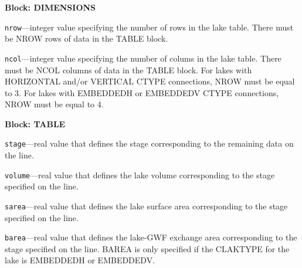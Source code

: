 
\item \textbf{Block: DIMENSIONS}

\begin{description}
\item \texttt{nrow}---integer value specifying the number of rows in the lake table. There must be NROW rows of data in the TABLE block.

\item \texttt{ncol}---integer value specifying the number of colums in the lake table. There must be NCOL columns of data in the TABLE block. For lakes with HORIZONTAL and/or VERTICAL CTYPE connections, NROW must be equal to 3. For lakes with EMBEDDEDH or EMBEDDEDV CTYPE connections, NROW must be equal to 4.

\end{description}
\item \textbf{Block: TABLE}

\begin{description}
\item \texttt{stage}---real value that defines the stage corresponding to the remaining data on the line.

\item \texttt{volume}---real value that defines the lake volume corresponding to the stage specified on the line.

\item \texttt{sarea}---real value that defines the lake surface area corresponding to the stage specified on the line.

\item \texttt{barea}---real value that defines the lake-GWF exchange area corresponding to the stage specified on the line. BAREA is only specified if the CLAKTYPE for the lake is EMBEDDEDH or EMBEDDEDV.

\end{description}

